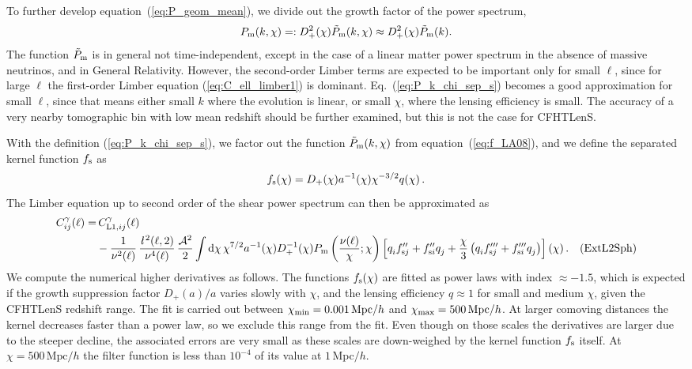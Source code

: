 \documentclass[fleqn,usenatbib]{mnras} %
\newcommand{\ellbar}{\hbox{\it \l}\,}
\newcommand{\pref}{{\cal A}}
\newcommand{\Label}[1]{\quad (\mbox{#1})}
\begin{document}
To further develop equation~(\ref{eq:P_geom_mean}), we divide out the growth factor of
the power spectrum,
%
\begin{equation}
 P_{\rm m}(k, \chi) =: D^2_+(\chi) \tilde P_{\rm m}(k, \chi) \approx D^2_+(\chi) \tilde P_{\rm m}(k).
  \label{eq:P_k_chi_sep_s}
\end{equation}
%
The function $\tilde P_{\rm m}$ is in general not time-independent, except
in the case of a linear matter power spectrum in the absence of massive
neutrinos, and in General Relativity. However, the second-order Limber terms
are expected to be important only for small $\ell$, since for large $\ell$ the first-order
Limber equation (\ref{eq:C_ell_limber1}) is dominant. Eq.~(\ref{eq:P_k_chi_sep_s})
becomes a good approximation for small $\ell$, since that means either small
$k$ where the evolution is linear, or small $\chi$, where the lensing
efficiency is small. The accuracy of a very nearby tomographic bin with low
mean redshift should be further examined, but this is not the case for
CFHTLenS.

With the definition (\ref{eq:P_k_chi_sep_s}), we factor out the function
$\tilde P_{\rm m}(k, \chi)$ from equation~(\ref{eq:f_LA08}), and we define the
separated kernel function $f_{\rm s}$ as
%
\begin{equation}
  f_{\rm s}(\chi) = D_+(\chi) a^{-1}(\chi) \chi^{-3/2} q(\chi) \, .
  \label{eq:f_LA08_s}
\end{equation}
%
The Limber equation up to second order of the shear power spectrum can then be approximated as
%
\begin{align}
  C^\gamma_{ij}(\ell) = & \, C^\gamma_{{\rm L1}, ij}(\ell) 
    \nonumber \\
    & - \frac 1 {\nu^2(\ell)} \, \frac{\ellbar^2(\ell, 2)}{\nu^4(\ell)} \,
    \frac{\pref^2}{2}
    \int {\rm d} \chi \, \chi^{7/2} a^{-1}(\chi) D_+^{-1}(\chi) P_{\rm m}\left(\frac{\nu(\ell)}\chi; \chi\right)
    \left[ q^{}_i f^{\prime\prime}_{{\rm s} j} + f^{\prime\prime}_{{\rm s}i} q^{}_j
      + \frac{\chi}{3} \left(
        q^{}_i f^{\prime\prime\prime}_{{\rm s}j} + f^{\prime\prime\prime}_{{\rm s}i} q^{}_j
      \right)
    \right](\chi) \, . \Label{ExtL2Sph}
  \label{eq:C_ell_limber2_dr_s}
\end{align}
%
We compute the numerical higher derivatives as follows. The functions $f_{\rm
s}(\chi)$ are fitted as power laws with index $\approx -1.5$, which is
expected if the growth suppression factor $D_+(a)/a$ varies slowly with $\chi$,
and the lensing efficiency $q \approx 1$ for small and medium $\chi$, given the
CFHTLenS redshift range. The fit is carried out between $\chi_{\rm min} = 0.001
\, {\rm Mpc}/h$ and $\chi_{\rm max} = 500 \, \mbox{Mpc}/h$. At larger comoving
distances the kernel decreases faster than a power law, so we exclude this
range from the fit. Even though on those scales the derivatives are larger due
to the steeper decline, the associated errors are very small as these scales
are down-weighed by the kernel function $f_{\rm s}$ itself. At $\chi = 500 \,
\mbox{Mpc}/h$ the filter function is less than $10^{-4}$ of its value 
at $1$\,Mpc$/h$.
\end{document}
